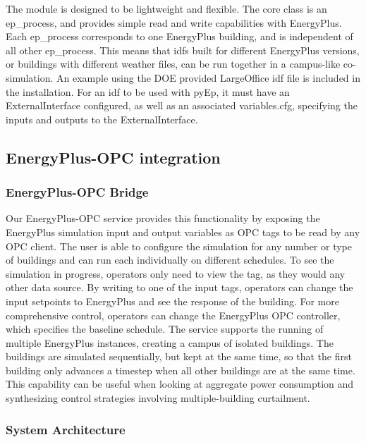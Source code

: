 The module is designed to be lightweight and flexible. The core class is an ep\_process, and provides simple read and write capabilities with EnergyPlus. Each ep\_process corresponds to one EnergyPlus building, and is independent of all other ep\_process. This means that idfs built for different EnergyPlus versions, or buildings with different weather files, can be run together in a campus-like co-simulation. An example using the DOE provided LargeOffice idf file is included in the installation. For an idf to be used with pyEp, it must have an ExternalInterface configured, as well as an associated variables.cfg, specifying the inputs and outputs to the ExternalInterface.

\subsection{EnergyPlus-OPC integration}

\subsubsection{EnergyPlus-OPC Bridge}
Our EnergyPlus-OPC service provides this functionality by exposing the EnergyPlus simulation input and output variables as OPC tags to be read by any OPC client. The user is able to configure the simulation for any number or type of buildings and can run each individually on different schedules. To see the simulation in progress, operators only need to view the tag, as they would any other data source. By writing to one of the input tags, operators can change the input setpoints to EnergyPlus and see the response of the building. For more comprehensive control, operators can change the EnergyPlus OPC controller, which specifies the baseline schedule.
The service supports the running of multiple EnergyPlus instances, creating a campus of isolated buildings. The buildings are simulated sequentially, but kept at the same time, so that the first building only advances a timestep when all other buildings are at the same time. This capability can be useful when looking at aggregate power consumption and synthesizing control strategies involving multiple-building curtailment.
\subsubsection{System Architecture}

